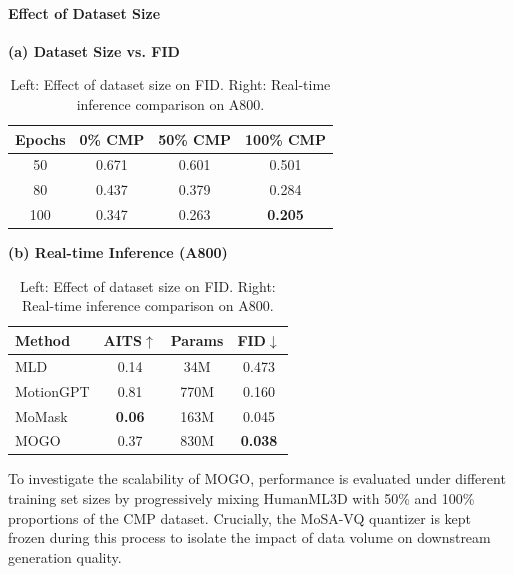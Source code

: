\documentclass[a4paper,12pt]{article}
\begin{document}
\paragraph{Effect of Dataset Size}
\begin{table}[t]
  \centering
  \scriptsize

  \label{tab:combined_fid_realtime}
  \renewcommand{\arraystretch}{1.15}

  \begin{minipage}[t]{0.48\linewidth}
    \centering
    \textbf{(a) Dataset Size vs. FID} \\
    \vspace{0.3em}
    \begin{tabular}{c|ccc}
      \toprule
      \textbf{Epochs} & \textbf{0\% CMP} & \textbf{50\% CMP} & \textbf{100\% CMP} \\
      \midrule
      50  & 0.671  & 0.601  & 0.501  \\
      80  & 0.437  & 0.379  & 0.284  \\
      100 & 0.347  & 0.263  & \textbf{0.205} \\
      \bottomrule
    \end{tabular}
  \end{minipage}
  \hfill
  \begin{minipage}[t]{0.48\linewidth}
    \centering
    \textbf{(b) Real-time Inference (A800)} \\
    \vspace{0.3em}
    \begin{tabular}{lccc}
      \toprule
      \textbf{Method}  & \textbf{AITS${\uparrow}$} & \textbf{Params} & \textbf{FID${\downarrow}$} \\
      \midrule
      MLD          & 0.14 & 34M & 0.473          \\
      MotionGPT    & 0.81 & 770M & 0.160          \\
      MoMask       & \textbf{0.06} & 163M & 0.045   \\
      MOGO         & 0.37 & 830M & \textbf{0.038} \\
      \bottomrule
    \end{tabular}
  \end{minipage}
      \caption{Left: Effect of dataset size on FID. Right: Real-time inference comparison on A800.}
  \label{tab:dataset_size_fid}

\end{table}

To investigate the scalability of MOGO, performance is evaluated under different training set sizes by progressively mixing HumanML3D with 50\% and 100\% proportions of the CMP dataset. Crucially, the MoSA-VQ quantizer is kept frozen during this process to isolate the impact of data volume on downstream generation quality.
\end{document}
